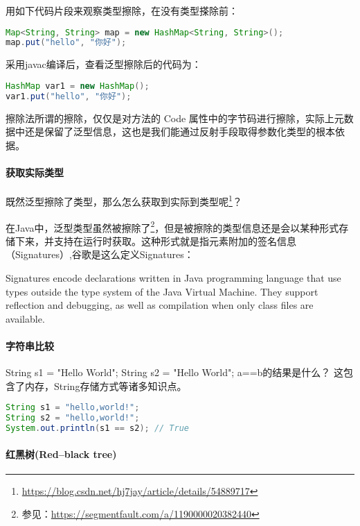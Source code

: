 \documentclass[../../../interview-questions.tex]{subfiles}
\begin{document}
用如下代码片段来观察类型擦除，在没有类型搽除前：

\begin{lstlisting}[language=Java]
Map<String, String> map = new HashMap<String, String>();
map.put("hello", "你好");
\end{lstlisting}

采用javac编译后，查看泛型擦除后的代码为：

\begin{lstlisting}[language=Java]
HashMap var1 = new HashMap();
var1.put("hello", "你好");
\end{lstlisting}

擦除法所谓的擦除，仅仅是对方法的 Code 属性中的字节码进行擦除，实际上元数据中还是保留了泛型信息，这也是我们能通过反射手段取得参数化类型的根本依据。

\paragraph{获取实际类型}

既然泛型擦除了类型，那么怎么获取到实际到类型呢\footnote{\url{https://blog.csdn.net/hj7jay/article/details/54889717}}？

在Java中，泛型类型虽然被擦除了\footnote{参见：\url{https://segmentfault.com/a/1190000020382440}}，但是被擦除的类型信息还是会以某种形式存储下来，并支持在运行时获取。这种形式就是指元素附加的签名信息（Signatures）,谷歌是这么定义Signatures：

Signatures encode declarations written in Java programming language that use types outside the type system of the Java Virtual Machine. They support reflection and debugging, as well as compilation when only class files are available.

\paragraph{字符串比较}

String s1 = "Hello World"; String s2 = "Hello World"; a==b的结果是什么？ 这包含了内存，String存储方式等诸多知识点。

\begin{lstlisting}[language=Java]
String s1 = "hello,world!";
String s2 = "hello,world!";
System.out.println(s1 == s2); // True
\end{lstlisting}

\paragraph{红黑树(Red–black tree)}
\end{document}

